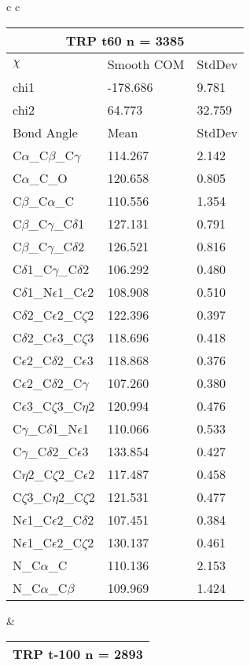 \begin{longtable}{ c c }
  \\
  \begin{tabular}{ l l l }
  \toprule
  \multicolumn{3}{c}{TRP \textbf{t60} n = 3385} \\ \toprule
  $\chi$       & Smooth COM & StdDev \\ \midrule
  chi1 & -178.686 & 9.781 \\ 
  chi2 & 64.773 & 32.759 \\ \midrule
  Bond Angle   & Mean     & StdDev \\ \midrule
  C$\alpha$\_C$\beta$\_C$\gamma$ & 114.267 & 2.142\\
  C$\alpha$\_C\_O & 120.658 & 0.805\\
  C$\beta$\_C$\alpha$\_C & 110.556 & 1.354\\
  C$\beta$\_C$\gamma$\_C$\delta$1 & 127.131 & 0.791\\
  C$\beta$\_C$\gamma$\_C$\delta$2 & 126.521 & 0.816\\
  C$\delta$1\_C$\gamma$\_C$\delta$2 & 106.292 & 0.480\\
  C$\delta$1\_N$\epsilon$1\_C$\epsilon$2 & 108.908 & 0.510\\
  C$\delta$2\_C$\epsilon$2\_C$\zeta$2 & 122.396 & 0.397\\
  C$\delta$2\_C$\epsilon$3\_C$\zeta$3 & 118.696 & 0.418\\
  C$\epsilon$2\_C$\delta$2\_C$\epsilon$3 & 118.868 & 0.376\\
  C$\epsilon$2\_C$\delta$2\_C$\gamma$ & 107.260 & 0.380\\
  C$\epsilon$3\_C$\zeta$3\_C$\eta$2 & 120.994 & 0.476\\
  C$\gamma$\_C$\delta$1\_N$\epsilon$1 & 110.066 & 0.533\\
  C$\gamma$\_C$\delta$2\_C$\epsilon$3 & 133.854 & 0.427\\
  C$\eta$2\_C$\zeta$2\_C$\epsilon$2 & 117.487 & 0.458\\
  C$\zeta$3\_C$\eta$2\_C$\zeta$2 & 121.531 & 0.477\\
  N$\epsilon$1\_C$\epsilon$2\_C$\delta$2 & 107.451 & 0.384\\
  N$\epsilon$1\_C$\epsilon$2\_C$\zeta$2 & 130.137 & 0.461\\
  N\_C$\alpha$\_C & 110.136 & 2.153\\
  N\_C$\alpha$\_C$\beta$ & 109.969 & 1.424\\
  \bottomrule
  \end{tabular}
  &
  \begin{tabular}{ l l l }
  \toprule
  \multicolumn{3}{c}{TRP \textbf{t-100} n = 2893} \\ \toprule

\end{tabular}
\end{longtable}
